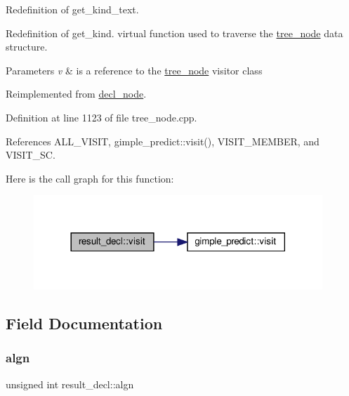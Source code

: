 Redefinition of get\+\_\+kind\+\_\+text. 

Redefinition of get\+\_\+kind. virtual function used to traverse the \hyperlink{classtree__node}{tree\+\_\+node} data structure. 
\begin{DoxyParams}{Parameters}
{\em v} & is a reference to the \hyperlink{classtree__node}{tree\+\_\+node} visitor class \\
\hline
\end{DoxyParams}


Reimplemented from \hyperlink{structdecl__node_a9e63331f0c35d9af9d1997afafe9152a}{decl\+\_\+node}.



Definition at line 1123 of file tree\+\_\+node.\+cpp.



References A\+L\+L\+\_\+\+V\+I\+S\+IT, gimple\+\_\+predict\+::visit(), V\+I\+S\+I\+T\+\_\+\+M\+E\+M\+B\+ER, and V\+I\+S\+I\+T\+\_\+\+SC.

Here is the call graph for this function\+:
\nopagebreak
\begin{figure}[H]
\begin{center}
\leavevmode
\includegraphics[width=308pt]{dc/d38/structresult__decl_a139725df13e7c33ae94f604d42aa708e_cgraph}
\end{center}
\end{figure}


\subsection{Field Documentation}
\mbox{\label{structresult__decl_a9112408cf30b8c711b2fcde3add3c7ff}} 
\subsubsection{\texorpdfstring{algn}{algn}}
{\footnotesize\ttfamily unsigned int result\+\_\+decl\+::algn}



